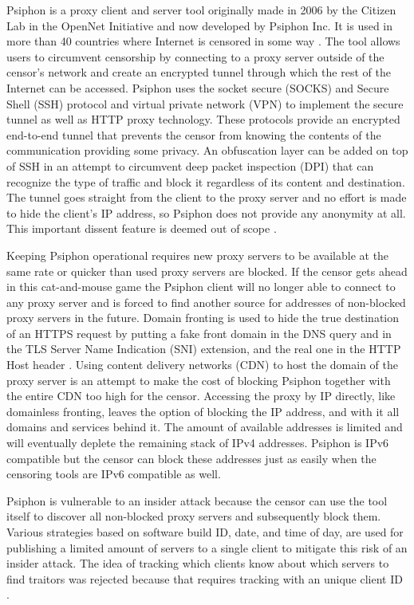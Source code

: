 \documentclass[conference,compsoc]{IEEEtran}
\begin{document}
Psiphon is a proxy client and server tool originally made in 2006 by the Citizen Lab in the OpenNet Initiative and now developed by Psiphon Inc.
It is used in more than 40 countries where Internet is censored in some way \cite{hoag2012syria}.
The tool allows users to circumvent censorship by connecting to a proxy server outside of the censor's network and create an encrypted tunnel through which the rest of the Internet can be accessed.
Psiphon uses the socket secure (SOCKS) and  Secure Shell (SSH) protocol and virtual private network (VPN) to implement the secure tunnel as well as HTTP proxy technology.
These protocols provide an encrypted end-to-end tunnel that prevents the censor from knowing the contents of the communication providing some privacy.
An obfuscation layer can be added on top of SSH in an attempt to circumvent deep packet inspection (DPI) that can recognize the type of traffic and block it regardless of its content and destination.
The tunnel goes straight from the client to the proxy server and no effort is made to hide the client's IP address, so Psiphon does not provide any anonymity at all.
This important dissent feature is deemed out of scope \cite{isec2014psiphon}.

Keeping Psiphon operational requires new proxy servers to be available at the same rate or quicker than used proxy servers are blocked.
If the censor gets ahead in this cat-and-mouse game the Psiphon client will no longer able to connect to any proxy server and is forced to find another source for addresses of non-blocked proxy servers in the future.
Domain fronting is used to hide the true destination of an HTTPS request by putting a fake front domain in the DNS query and in the TLS Server Name Indication (SNI) extension, and the real one in the HTTP Host header \cite{fifield2015domain}.
Using content delivery networks (CDN) to host the domain of the proxy server is an attempt to make the cost of blocking Psiphon together with the entire CDN too high for the censor.
Accessing the proxy by IP directly, like domainless fronting, leaves the option of blocking the IP address, and with it all domains and services behind it.
The amount of available addresses is limited and will eventually deplete the remaining stack of IPv4 addresses.
Psiphon is IPv6 compatible but the censor can block these addresses just as easily when the censoring tools are IPv6 compatible as well.

Psiphon is vulnerable to an insider attack because the censor can use the tool itself to discover all non-blocked proxy servers and subsequently block them.
Various strategies based on software build ID, date, and time of day, are used for publishing a limited amount of servers to a single client to mitigate this risk of an insider attack.
The idea of tracking which clients know about which servers to find traitors was rejected because that requires tracking with an unique client ID \cite{psiphon2011design}.
\end{document}
